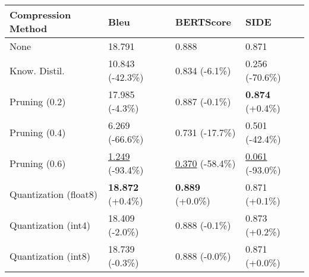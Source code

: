 \begin{tabular}{llll}
\toprule
\textbf{Compression Method} & \textbf{Bleu} & \textbf{BERTScore} & \textbf{SIDE} \\
\midrule
None & 18.791 & 0.888 & 0.871 \\
Know. Distil. & 10.843 (-42.3\%) & 0.834 (-6.1\%) & 0.256 (-70.6\%) \\
Pruning (0.2) & 17.985 (-4.3\%) & 0.887 (-0.1\%) & \textbf{0.874} (+0.4\%) \\
Pruning (0.4) & 6.269 (-66.6\%) & 0.731 (-17.7\%) & 0.501 (-42.4\%) \\
Pruning (0.6) & \underline{1.249} (-93.4\%) & \underline{0.370} (-58.4\%) & \underline{0.061} (-93.0\%) \\
Quantization (float8) & \textbf{18.872} (+0.4\%) & \textbf{0.889} (+0.0\%) & 0.871 (+0.1\%) \\
Quantization (int4) & 18.409 (-2.0\%) & 0.888 (-0.1\%) & 0.873 (+0.2\%) \\
Quantization (int8) & 18.739 (-0.3\%) & 0.888 (-0.0\%) & 0.871 (+0.0\%) \\
\bottomrule
\end{tabular}
